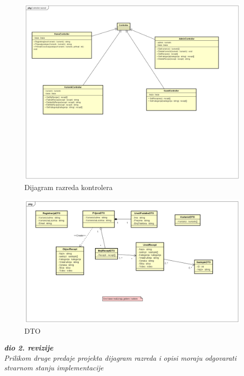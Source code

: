 \begin{figure}[H]
	\includegraphics[width=\textwidth]{slike/ControllerRazredi.png} %
	\centering
	\caption{Dijagram razreda kontrolera}
	\label{fig:dijagramkontr}
\end{figure}

\begin{figure}[H]
	\includegraphics[width=\textwidth]{slike/DTO.png} %
	\centering
	\caption{DTO}
	\label{fig:dijagramdto}
\end{figure}

\textbf{\textit{dio 2. revizije}}\\

\textit{Prilikom druge predaje projekta dijagram razreda i opisi moraju odgovarati stvarnom stanju implementacije}



